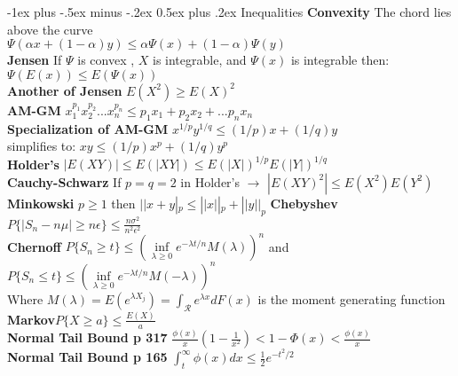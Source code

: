 \documentclass[10pt,landscape]{article}
\makeatletter
\renewcommand{\section}{\@startsection{section}{1}{0mm}%
                                {-1ex plus -.5ex minus -.2ex}%
                                {0.5ex plus .2ex}%
                                {\normalfont\large\bfseries}}
\makeatother
\begin{document}
\begin{multicols*}{3}
\section{Inequalities}
\textbf{Convexity} The chord lies above the curve\\
$\Psi(\alpha x +(1-\alpha)y)\leq \alpha\Psi(x)+(1-\alpha)\Psi(y)$\\
\textbf{Jensen} If $\Psi$ is convex , $X$ is integrable, and $\Psi(x)$ is integrable then:
$\Psi(E(x))\leq E(\Psi(x))$\\
\textbf{Another of Jensen} $E(X^2)\geq E(X)^2$\\
\textbf{AM-GM} $ x_1^{p_1} x_2^{p_2}...x_n^{p_n}\leq p_1 x_1 +p_2 x_2 + ... p_n x_n$\\
\textbf{Specialization of AM-GM} $x^{1/p} y^{1/q} \leq (1/p) x +(1/q) y$\\
simplifies to: $ xy \leq (1/p) x^p +(1/q) y^p$\\
\textbf{Holder's} $|E(XY)| \leq E(|XY|) \leq E(|X|)^{1/p} E(|Y|)^{1/q}$\\ 
\textbf{Cauchy-Schwarz} If $p=q=2$ in Holder's $\rightarrow$ $|E(XY)^2| \leq E(X^2)E(Y^2)$\\
\textbf{Minkowski} $p\geq 1$ then $ ||x+y|_p \leq ||x||_p + ||y||_p$
\textbf{Chebyshev}$P\{|S_n-n\mu|\geq n\epsilon\}\leq \frac{n\sigma^2}{n^2\epsilon^2}$\\
\textbf{Chernoff} $P\{S_n\geq t\} \leq (\inf\limits_{\lambda\geq 0} e^{-\lambda t/n}M(\lambda))^n $ and\\
$P\{S_n\leq t\} \leq (\inf\limits_{\lambda\geq 0} e^{-\lambda t/n}M(-\lambda))^n $\\ 
Where $M(\lambda)=E(e^{\lambda X_j})=\int_{\mathcal{R}} e^{\lambda x}dF(x)$ is the moment generating function\\
\textbf{Markov}$P\{X\geq a\} \leq \frac {E(X)}{a}$\\
\textbf{Normal Tail Bound p 317} $\frac{\phi(x)}{x}(1-\frac{1}{x^2}) < 1- \Phi(x) < \frac {\phi(x)}{x} $\\
\textbf{Normal Tail Bound p 165} $\int_{t}^{\infty}\phi(x) dx \leq \frac{1}{2}e^{-t^2/2}$

\end{multicols*}
\end{document}
